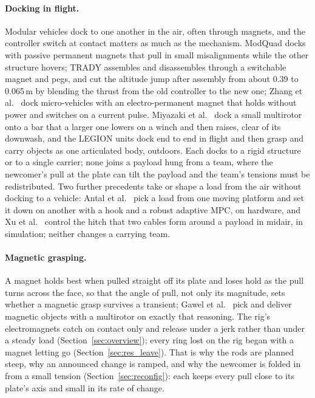 \paragraph{Docking in flight.} Modular vehicles dock to one another in the air, often through magnets, and the
controller switch at contact matters as much as the mechanism. ModQuad docks with passive permanent magnets that
pull in small misalignments while the other structure hovers; TRADY \cite{sugihara2023trady} assembles and
disassembles through a switchable magnet and pegs, and cut the altitude jump after assembly from about 0.39 to
0.065\,m by blending the thrust from the old controller to the new one; Zhang et al.\ \cite{zhang2026epm} dock
micro-vehicles with an electro-permanent magnet that holds without power and switches on a current pulse. Miyazaki
et al.\ \cite{miyazaki2018airborne} dock a small multirotor onto a bar that a larger one lowers on a winch and then
raises, clear of its downwash, and the LEGION units dock end to end in flight and then grasp and carry objects as
one articulated body, outdoors. Each docks to a rigid structure or to a single carrier; none joins a payload hung
from a team, where the newcomer's pull at the plate can tilt the payload and the team's tensions must be
redistributed. Two further precedents take or shape a load from the air without docking to a vehicle: Antal et
al.\ \cite{antal2026hook} pick a load from one moving platform and set it down on another with a hook and a robust
adaptive MPC, on hardware, and Xu et al.\ \cite{xu2026hitches} control the hitch that two cables form around a
payload in midair, in simulation; neither changes a carrying team.

\paragraph{Magnetic grasping.} A magnet holds best when pulled straight off its plate and loses hold as the pull
turns across the face, so that the angle of pull, not only its magnitude, sets whether a magnetic grasp survives
a transient; Gawel et al.\ \cite{gawel2017magnetic} pick and deliver magnetic objects with a multirotor on exactly that reasoning. The
rig's electromagnets catch on contact only and release under a jerk rather than under a steady load
(Section~\ref{sec:overview}); every ring lost on the rig began with a magnet letting go
(Section~\ref{sec:res_leave}). That is why the rods are planned steep, why an announced change is ramped, and why
the newcomer is folded in from a small tension (Section~\ref{sec:reconfig}): each keeps every pull close to its
plate's axis and small in its rate of change.
